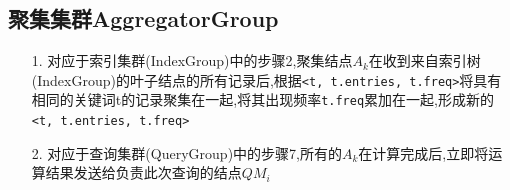 \documentclass{elegantpaper}
\begin{document}
\subsection{聚集集群AggregatorGroup}
\begin{itemize}
    \item[1.] 对应于索引集群(IndexGroup)中的步骤2,聚集结点$A_k$在收到来自索引树(IndexGroup)的叶子结点的所有记录后,根据\verb|<t, t.entries, t.freq>|将具有相同的关键词t的记录聚集在一起,将其出现频率\verb|t.freq|累加在一起,形成新的\verb|<t, t.entries, t.freq>|
    \item[2.] 对应于查询集群(QueryGroup)中的步骤7,所有的$A_k$在计算完成后,立即将运算结果发送给负责此次查询的结点$QM_i$
\end{itemize}
\end{document}
